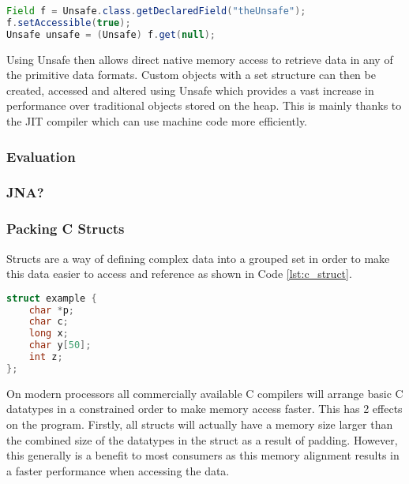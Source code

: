 \documentclass[final_report.tex]{subfiles}
\begin{document}
\begin{lstlisting}[language=Java, caption={Accessing Java Unsafe}, label=lst:java_unsafe]
Field f = Unsafe.class.getDeclaredField("theUnsafe");
f.setAccessible(true);
Unsafe unsafe = (Unsafe) f.get(null);
\end{lstlisting}

Using Unsafe then allows direct native memory access to retrieve data in any of the primitive data formats. Custom objects with a set structure can then be created, accessed and altered using Unsafe which provides a vast increase in performance over traditional objects stored on the heap. This is mainly thanks to the JIT compiler which can use machine code more efficiently.

\subsubsection{Evaluation}

\subsubsection{JNA?}

\subsubsection{Packing C Structs}
Structs are a way of defining complex data into a grouped set in order to make this data easier to access and reference as shown in Code \ref{lst:c_struct}.

\begin{lstlisting}[language=C, caption={Example C Struct}, label=lst:c_struct]
struct example {
    char *p;
    char c;
    long x;
    char y[50];
    int z;
};
\end{lstlisting}

On modern processors all commercially available C compilers will arrange basic C datatypes in a constrained order to make memory access faster. This has 2 effects on the program. Firstly, all structs will actually have a memory size larger than the combined size of the datatypes in the struct as a result of padding. However, this generally is a benefit to most consumers as this memory alignment results in a faster performance when accessing the data.

\end{document}
